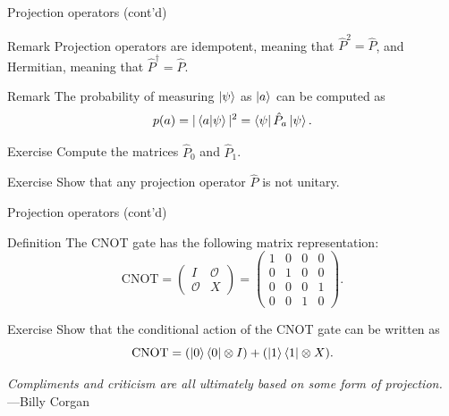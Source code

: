 \documentclass{beamer}
\renewcommand{\O}{\mathcal O}
\newcommand{\CNOT}{\text{CNOT}}
\begin{document}
\begin{frame}{Projection operators (cont'd)}
	    \begin{block}{Remark}
    Projection operators are idempotent, meaning that $\hat P^2 = \hat P$, and Hermitian, meaning that $\hat P^\dagger = \hat P$.
    \end{block}
	    \begin{block}{Remark}
        The probability of measuring $\ket\psi$ as $\ket a$ can be computed as $$ p(a) = |\braket{a|\psi}|^2  = \bra \psi \hat P_a\ket\psi.$$
    \end{block}
	  \begin{block}{Exercise}
        Compute the matrices $\hat P_0$ and $\hat P_1$.
    \end{block}
    \begin{block}{Exercise}
    	Show that any projection operator $\hat P$ is not unitary.
    \end{block}
\end{frame}

\begin{frame}{Projection operators (cont'd)}

    \begin{block}{Definition}
        The CNOT gate has the following matrix representation: $$ \CNOT = \begin{pmatrix}
            I & \O \\ \O & X
        \end{pmatrix} = \begin{pmatrix}
            1 & 0 & 0 & 0 \\
            0 & 1 & 0 & 0 \\
            0 & 0 & 0 & 1 \\
            0 & 0 & 1 & 0
        \end{pmatrix}. $$
    \end{block}
    \begin{block}{Exercise}
        Show that the conditional action of the CNOT gate can be written as $$ \CNOT = (\ket0\bra0\otimes I) + (\ket1\bra1\otimes X).$$
    \end{block}
	\begin{flushright}
		\textit{Compliments and criticism are all ultimately based on some form of projection.}\\---Billy Corgan
	\end{flushright}
\end{frame}
\end{document}
